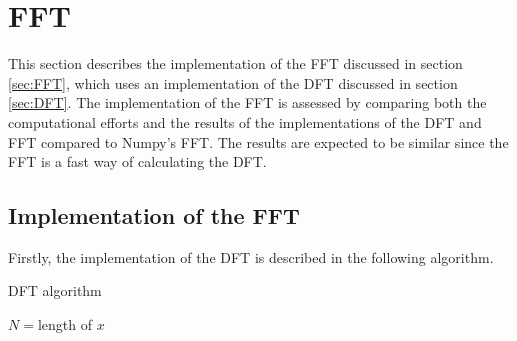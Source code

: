 \section{FFT}
This section describes the implementation of the FFT discussed in section \ref{sec:FFT}, which uses an implementation of the DFT discussed in section \ref{sec:DFT}. The implementation of the FFT is assessed by comparing both the computational efforts and the results of the implementations of the DFT and FFT compared to Numpy's FFT. The results are expected to be similar since the FFT is a fast way of calculating the DFT.

\subsection{Implementation of the FFT}
Firstly, the implementation of the DFT is described in the following algorithm.
\begin{algorithm}
\caption{DFT algorithm}
\label{DFTalg}
\begin{algorithmic}[1]
\State $N =$length of $x$ 
		 
		\EndFor
	\EndFor
\EndProcedure
\end{algorithmic}
\end{algorithm}

